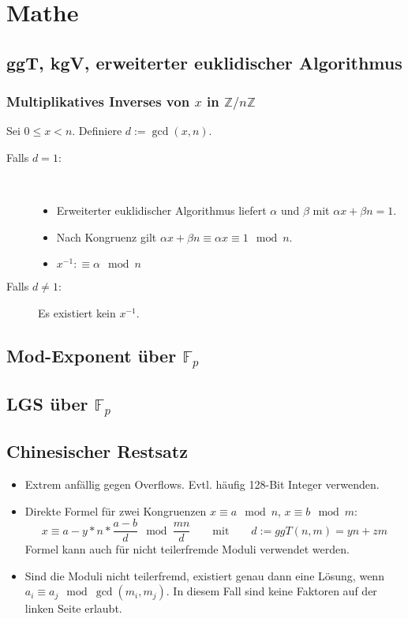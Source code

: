 \section{Mathe}

\subsection{ggT, kgV, erweiterter euklidischer Algorithmus}



\subsubsection{Multiplikatives Inverses von $x$ in $\mathbb{Z}/n\mathbb{Z}$}
Sei $0 \leq x < n$. Definiere $d := \gcd(x, n)$.
\begin{description}
	\item[Falls $d = 1$:] ~
	\begin{itemize}[nosep]
		\item Erweiterter euklidischer Algorithmus liefert $\alpha$ und $\beta$ mit
		$\alpha x + \beta n = 1$.
		\item Nach Kongruenz gilt $\alpha x + \beta n \equiv \alpha x \equiv 1 \mod n$.
		\item $x^{-1} :\equiv \alpha \mod n$
	\end{itemize}
	\item[Falls $d \neq 1$:] Es existiert kein $x^{-1}$.
\end{description}


\subsection{Mod-Exponent über $\mathbb{F}_p$}


\subsection{LGS über $\mathbb{F}_p$}


\subsection{Chinesischer Restsatz}
\begin{itemize}
	\item Extrem anfällig gegen Overflows. Evtl. häufig 128-Bit Integer verwenden.
	\item Direkte Formel für zwei Kongruenzen $x \equiv a \mod n$, $x \equiv b \mod m$:
		\[
			x \equiv a - y * n * \frac{a - b}{d} \mod \frac{mn}{d}
			\qquad \text{mit} \qquad
			d := ggT(n, m) = yn + zm
		\]
		Formel kann auch für nicht teilerfremde Moduli verwendet werden.
	\item Sind die Moduli nicht teilerfremd, existiert genau dann eine Lösung,
	wenn $a_i \equiv a_j \mod \gcd(m_i, m_j)$. In diesem Fall sind keine Faktoren
	auf der linken Seite erlaubt.
\end{itemize}


